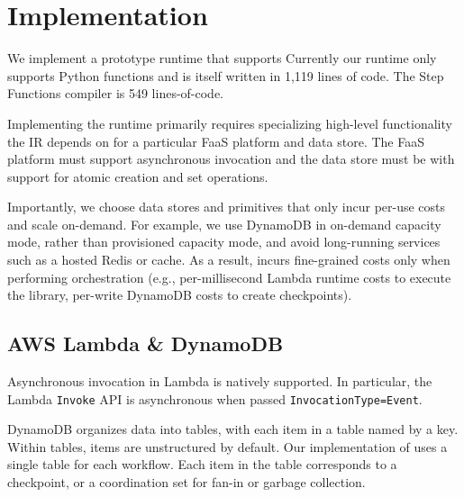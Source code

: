 \section{Implementation}\label{sec:impl}

We implement a prototype \name{} runtime that supports  Currently our runtime only supports
Python functions and is itself written in 1,119 lines of code. The Step
Functions compiler is 549 lines-of-code.

Implementing the runtime primarily requires specializing high-level
functionality the IR depends on for a particular FaaS platform and data
store. The FaaS platform must support asynchronous invocation and the data
store must be  with support for atomic
creation and set operations.

Importantly, we choose data stores and primitives that only incur per-use
costs and scale on-demand. For example, we use DynamoDB in on-demand capacity
mode, rather than provisioned capacity mode, and avoid long-running services
such as a hosted Redis or cache. As a result, \name{} incurs \secondedits
{fine-grained costs only when performing orchestration (e.g., per-millisecond
Lambda runtime costs to execute the \name{} library, per-write DynamoDB costs
to create checkpoints)}.

\subsection{AWS Lambda \& DynamoDB}

Asynchronous invocation in Lambda is natively supported. In particular, the
Lambda \texttt{Invoke} API is asynchronous when passed
\texttt{InvocationType=Event}. 

DynamoDB organizes data into tables, with each item in a table named by a key.
Within tables, items are unstructured by default. Our implementation of
\name{} uses a single table for each workflow. Each item in the table
corresponds to a checkpoint, or a coordination set for fan-in or garbage
collection.

